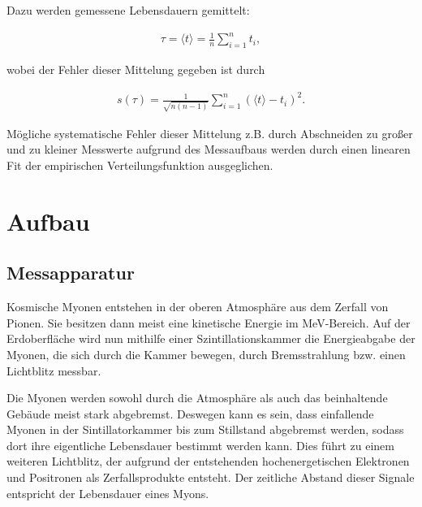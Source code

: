 Dazu werden gemessene Lebensdauern gemittelt:

\begin{align}
	\tau = \langle t \rangle = \frac{1}{n} \sum_{i=1}^{n} t_i,
\end{align}

wobei der Fehler dieser Mittelung gegeben ist durch

\begin{align}
	s(\tau) = \frac{1}{\sqrt{n(n-1)}} \sum_{i=1}^{n} (\langle t \rangle - t_i)^2 .
\end{align}

M\"ogliche systematische Fehler dieser Mittelung z.B. durch Abschneiden zu gro{\ss}er und zu kleiner Messwerte aufgrund des Messaufbaus werden durch einen linearen Fit der empirischen Verteilungsfunktion ausgeglichen.

\section{Aufbau}
\subsection{Messapparatur}
Kosmische Myonen entstehen in der oberen Atmosph\"are aus dem Zerfall von Pionen. Sie besitzen dann meist eine kinetische Energie im MeV-Bereich. Auf der Erdoberfl\"ache wird nun mithilfe einer Szintillationskammer die Energieabgabe der Myonen, die sich durch die Kammer bewegen, durch Bremsstrahlung bzw. einen Lichtblitz messbar. 

Die Myonen werden sowohl durch die Atmosph\"are als auch das beinhaltende Geb\"aude meist stark abgebremst. Deswegen kann es sein, dass einfallende Myonen in der Sintillatorkammer bis zum Stillstand abgebremst werden, sodass dort ihre eigentliche Lebensdauer bestimmt werden kann. Dies f\"uhrt zu einem weiteren Lichtblitz, der aufgrund der entstehenden hochenergetischen Elektronen und Positronen als Zerfallsprodukte entsteht. Der zeitliche Abstand dieser Signale entspricht der Lebensdauer eines Myons.

